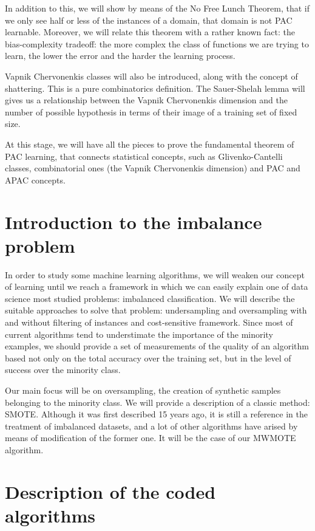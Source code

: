 In addition to this, we will show by means of the No Free Lunch Theorem, that if we only see half or less of the instances 
of a domain, that domain is not PAC learnable. Moreover, we will relate this theorem with a rather known fact: the 
bias-complexity tradeoff: the more complex the class of functions we are trying to learn, the lower the error and the
harder the learning process.

Vapnik Chervonenkis classes will also be introduced, along with the concept of shattering. This is a pure combinatorics
definition. The Sauer-Shelah lemma will gives us a relationship between the Vapnik Chervonenkis dimension and the number
of possible hypothesis in terms of their image of a training set of fixed size. 

At this stage, we will have all the pieces to prove the fundamental theorem of PAC learning, that connects statistical
concepts, such as Glivenko-Cantelli classes, combinatorial ones (the Vapnik Chervonenkis dimension) and PAC and APAC
concepts.

\section*{Introduction to the imbalance problem}

In order to study some machine learning algorithms, we will weaken our concept of learning until we reach a framework in which
we can easily explain one of data science most studied problems: imbalanced classification. We will describe the suitable
approaches to solve that problem: undersampling and oversampling with and without filtering of instances and cost-sensitive 
framework. Since most of current algorithms tend to understimate the importance of the minority examples, 
we should provide a set of measurements of the quality of an algorithm based not only on the total accuracy over the training
set, but in the level of success over the minority class.

Our main focus will be on oversampling, the creation of synthetic samples belonging to the minority class. We will provide
a description of a classic method: SMOTE. Although it was first described 15 years ago, it is still a reference in the
treatment of imbalanced datasets, and a lot of other algorithms have arised by means of modification of the former one. It will be the case
of our MWMOTE algorithm.

\section*{Description of the coded algorithms}


